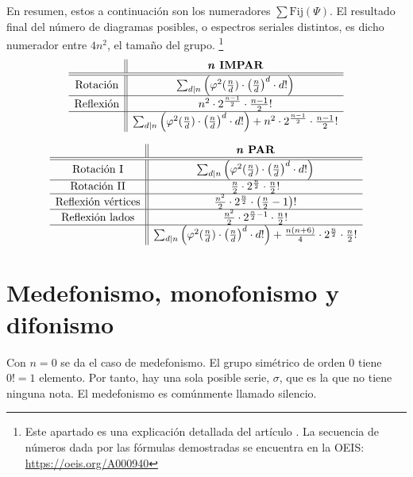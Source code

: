 		En resumen, estos a continuación son los numeradores $\sum%
		\text{Fij}(\Psi)$. El resultado final del número de diagramas posibles, o espectros seriales distintos, es dicho numerador entre $4n^2$, el tamaño del grupo. \footnote{Este apartado es una explicación detallada del artículo \cite{polygons}. La secuencia de números dada por las fórmulas demostradas se encuentra en la OEIS: \url{https://oeis.org/A000940}}		
		\def\arraystretch{1.25}
		\[\begin{array}{c||c}
		&\textbf{\textit{n} IMPAR}\\\hline\hline
		\text{Rotación}&\sum_{d|n}\left(\varphi^2(\frac{n}{d})\cdot\left(\frac{n}{d}\right)^d\cdot d!\right)\\\hline
		\text{Reflexión}&n^2\cdot2^{\frac{n-1}{2}}\cdot\frac{n-1}{2}!\\\hline
		&\sum_{d|n}\left(\varphi^2(\frac{n}{d})\cdot\left(\frac{n}{d}\right)^d\cdot d!\right)+n^2\cdot2^{\frac{n-1}{2}}\cdot\frac{n-1}{2}!\\
		\end{array}\]
		
		\[\begin{array}{c||c}
		&\textbf{\textit{n} PAR}\\\hline\hline
		\text{Rotación I}&\sum_{d|n}\left(\varphi^2(\frac{n}{d})\cdot\left(\frac{n}{d}\right)^d\cdot d!\right)\\\hline
		\text{Rotación II}&\frac{n}{2}\cdot2^{\frac{n}{2}}\cdot\frac{n}{2}!\\\hline
		\text{Reflexión vértices}&\frac{n^2}{2}\cdot2^{\frac{n}{2}}\cdot\left(\frac{n}{2}-1\right)!\\\hline
		\text{Reflexión lados}&\frac{n^2}{2}\cdot2^{\frac{n}{2}-1}\cdot\frac{n}{2}!\\\hline
		&\sum_{d|n}\left(\varphi^2(\frac{n}{d})\cdot\left(\frac{n}{d}\right)^d\cdot d!\right)+\frac{n(n+6)}{4}\cdot2^{\frac{n}{2}}\cdot\frac{n}{2}!\\
		\end{array}\]
		\def\arraystretch{1}
		
	\section{Medefonismo, monofonismo y difonismo}
	\label{monodi}
		Con $n=0$ se da el caso de medefonismo. El grupo simétrico de orden 0 tiene $0!=1$ elemento. Por tanto, hay una sola posible serie, $\sigma$, que es la que no tiene ninguna nota. El medefonismo es comúnmente llamado silencio.
		
